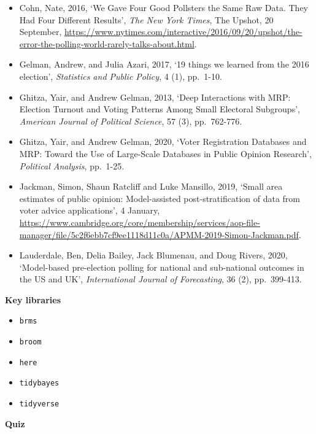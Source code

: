 \documentclass[
]{book}
\providecommand{\tightlist}{%
  \setlength{\itemsep}{0pt}\setlength{\parskip}{0pt}}
\begin{document}
\begin{itemize}
\tightlist
\item
  Cohn, Nate, 2016, `We Gave Four Good Pollsters the Same Raw Data. They Had Four Different Results', \emph{The New York Times}, The Upshot, 20 September, \url{https://www.nytimes.com/interactive/2016/09/20/upshot/the-error-the-polling-world-rarely-talks-about.html}.
\item
  Gelman, Andrew, and Julia Azari, 2017, `19 things we learned from the 2016 election', \emph{Statistics and Public Policy}, 4 (1), pp.~1-10.
\item
  Ghitza, Yair, and Andrew Gelman, 2013, `Deep Interactions with MRP: Election Turnout and Voting Patterns Among Small Electoral Subgroups', \emph{American Journal of Political Science}, 57 (3), pp.~762-776.
\item
  Ghitza, Yair, and Andrew Gelman, 2020, `Voter Registration Databases and MRP: Toward the Use of Large-Scale Databases in Public Opinion Research', \emph{Political Analysis}, pp.~1-25.
\item
  Jackman, Simon, Shaun Ratcliff and Luke Mansillo, 2019, `Small area estimates of public opinion: Model-assisted post-stratification of data from voter advice applications', 4 January, \url{https://www.cambridge.org/core/membership/services/aop-file-manager/file/5c2f6ebb7cf9ee1118d11c0a/APMM-2019-Simon-Jackman.pdf}.
\item
  Lauderdale, Ben, Delia Bailey, Jack Blumenau, and Doug Rivers, 2020, `Model-based pre-election polling for national and sub-national outcomes in the US and UK', \emph{International Journal of Forecasting}, 36 (2), pp.~399-413.
\end{itemize}

\textbf{Key libraries}

\begin{itemize}
\tightlist
\item
  \texttt{brms}
\item
  \texttt{broom}
\item
  \texttt{here}
\item
  \texttt{tidybayes}
\item
  \texttt{tidyverse}
\end{itemize}

\textbf{Quiz}
\end{document}
